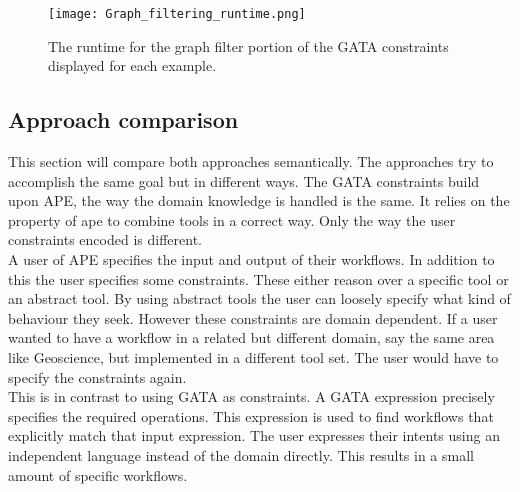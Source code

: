 \documentclass{article}
\begin{document}
\begin{figure}[H]
  \centering
    \texttt{[image: Graph\_filtering\_runtime.png]}
    \caption{The runtime for the graph filter portion of the GATA constraints displayed for each example. }
    \label{figure:graphFiltertime}
\end{figure}


 
 

\subsection{Approach comparison}
This section will compare both approaches semantically. The approaches try to accomplish the same goal but in different ways. The GATA constraints build upon APE, the way the domain knowledge is handled is the same. It relies on the property of ape to combine tools in a correct way. Only the way the user constraints encoded is different.\\

A user of APE specifies the input and output of their workflows. In addition to this the user specifies some constraints. These either reason over a specific tool or an abstract tool. By using abstract tools the user can loosely specify what kind of behaviour they seek. 
However these constraints are domain dependent. If a user wanted to have a workflow in a related but different domain, say the same area like Geoscience, but implemented in a different tool set. The user would have to specify the constraints again. 
\\

This is in contrast to using GATA as constraints. 
A GATA expression precisely specifies the required operations. 
This expression is used to find workflows that explicitly match that input expression. The user expresses their intents using an independent language instead of the domain directly. This results in a small amount of specific workflows. 
\\
\end{document}
